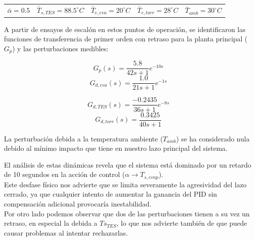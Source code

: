 \documentclass[12pt,a4paper]{article}
\begin{document}
	\begin{center}
		\small
		\begin{tabular}{ccccc}
			$\bar{\alpha} = 0.5$ & $\bar{T}_{s,TES} = 88.5^\circ C$ & $\bar{T}_{e,eva} = 20^\circ C$ & $\bar{T}_{e,torr} = 28^\circ C$ & $\bar{T}_{amb} = 30^\circ C$ \\
		\end{tabular}
	\end{center}
	
	A partir de ensayos de escalón en estos puntos de operación, se identificaron las funciones de transferencia de primer orden con retraso para la planta principal ($G_p$) y las perturbaciones medibles:
	
	\begin{minipage}{0.48\textwidth}
		\small
		\begin{equation*}
			G_p(s) = \frac{5.8}{42s+1}e^{-10s} 
		\end{equation*}
		\begin{equation*}
			G_{d,eva}(s) = \frac{1.0}{21s+1}e^{-1s}
		\end{equation*}
	\end{minipage}
	\hfill
	\begin{minipage}{0.48\textwidth}
		\small
		\begin{equation*}
			G_{d,TES}(s) = \frac{-0.2435}{36s+1}e^{-8s}
		\end{equation*}
		\begin{equation*}
			G_{d,torr}(s) = \frac{0.3425}{40s+1}
		\end{equation*}
	\end{minipage}
		\vspace{0.5em}
		
	La perturbación debida a la temperatura ambiente ($T_{amb}$) se ha considerado nula debido al mínimo impacto que tiene en nuestro lazo principal del sistema. \\
	\vspace{0.5em}
	
	El análisis de estas dinámicas revela que el sistema está dominado por un retardo de 10 segundos en la acción de control ($\alpha \to T_{s,evap}$). \\
	Este desfase físico nos advierte que se limita severamente la agresividad del lazo cerrado, ya que cualquier intento de aumentar la ganancia del PID sin compensación adicional provocaría inestabilidad. \\
	Por otro lado podemos observar que dos de las perturbaciones tienen a su vez un retraso, en especial la debida a $Ts_{TES}$, lo que nos advierte también de que puede causar problemas al intentar rechazarlas. 
	
\end{document}
